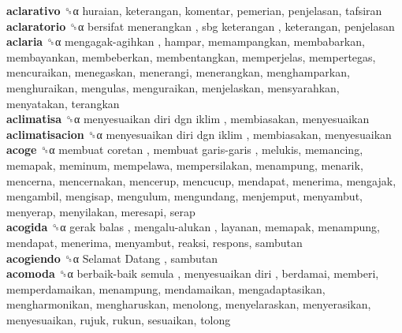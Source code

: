 \textbf{aclarativo} ␝α  huraian, keterangan, komentar, pemerian, penjelasan, tafsiran  \\
\textbf{aclaratorio} ␝α   bersifat menerangkan ,  sbg keterangan , keterangan, penjelasan  \\
\textbf{aclaria} ␝α   mengagak-agihkan , hampar, memampangkan, membabarkan, membayankan, membeberkan, membentangkan, memperjelas, mempertegas, mencuraikan, menegaskan, menerangi, menerangkan, menghamparkan, menghuraikan, mengulas, menguraikan, menjelaskan, mensyarahkan, menyatakan, terangkan  \\
\textbf{aclimatisa} ␝α   menyesuaikan diri dgn iklim , membiasakan, menyesuaikan  \\
\textbf{aclimatisacion} ␝α   menyesuaikan diri dgn iklim , membiasakan, menyesuaikan  \\
\textbf{acoge} ␝α   membuat coretan ,  membuat garis-garis , melukis, memancing, memapak, meminum, mempelawa, mempersilakan, menampung, menarik, mencerna, mencernakan, mencerup, mencucup, mendapat, menerima, mengajak, mengambil, mengisap, mengulum, mengundang, menjemput, menyambut, menyerap, menyilakan, meresapi, serap  \\
\textbf{acogida} ␝α   gerak balas ,  mengalu-alukan , layanan, memapak, menampung, mendapat, menerima, menyambut, reaksi, respons, sambutan  \\
\textbf{acogiendo} ␝α   Selamat Datang , sambutan  \\
\textbf{acomoda} ␝α   berbaik-baik semula ,  menyesuaikan diri , berdamai, memberi, memperdamaikan, menampung, mendamaikan, mengadaptasikan, mengharmonikan, mengharuskan, menolong, menyelaraskan, menyerasikan, menyesuaikan, rujuk, rukun, sesuaikan, tolong  \\
